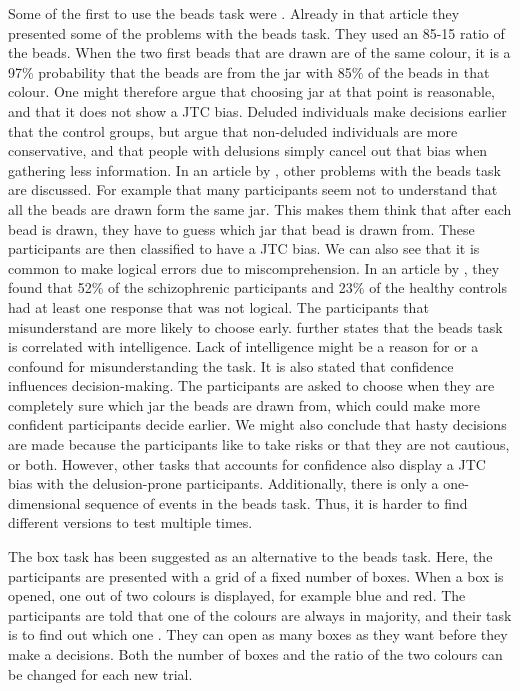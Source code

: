 Some of the first to use the beads task were \citet{huq1988}. Already in that article they presented some of the problems with the beads task. They used an 85-15 ratio of the beads. When the two first beads that are drawn are of the same colour, it is a 97\% probability that the beads are from the jar with 85\% of the beads in that colour. One might therefore argue that choosing jar at that point is reasonable, and that it does not show a JTC bias. Deluded individuals make decisions earlier that the control groups, but \citeauthor{huq1988} argue that non-deluded individuals are more conservative, and that people with delusions simply cancel out that bias when gathering less information. In an article by \citet{moritz2017}, other problems with the beads task are discussed. For example that many participants seem not to understand that all the beads are drawn form the same jar. This makes them think that after each bead is drawn, they have to guess which jar that bead is drawn from. These participants are then classified to have a JTC bias. We can also see that it is common to make logical errors due to miscomprehension. In an article by \citet{moritz2005}, they found that 52\% of the schizophrenic participants and 23\% of the healthy controls had at least one response that was not logical. The participants that misunderstand are more likely to choose early. \citet{moritz2017} further states that the beads task is correlated with intelligence. Lack of intelligence might be a reason for or a confound for misunderstanding the task. It is also stated that confidence influences decision-making. The participants are asked to choose when they are completely sure which jar the beads are drawn from, which could make more confident participants decide earlier. We might also conclude that hasty decisions are made because the participants like to take risks or that they are not cautious, or both. However, other tasks that accounts for confidence also display a JTC bias with the delusion-prone participants. Additionally, there is only a one-dimensional sequence of events in the beads task. Thus, it is harder to find different versions to test multiple times. 

The box task has been suggested as an alternative to the beads task. Here, the participants are presented with a grid of a fixed number of boxes. When a box is opened, one out of two colours is displayed, for example blue and red. The participants are told that one of the colours are always in majority, and their task is to find out which one \citep{moritz2017}. They can open as many boxes as they want before they make a decisions. Both the number of boxes and the ratio of the two colours can be changed for each new trial. 


